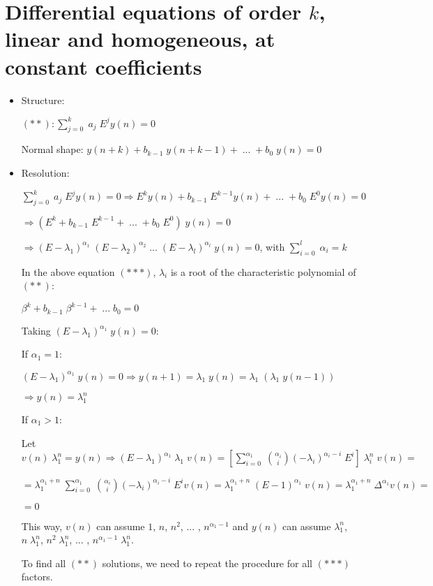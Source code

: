 \documentclass{article}
\begin{document}
\section{Differential equations of order $k$, linear and homogeneous, at constant coefficients}

\begin{itemize}

\item Structure:

$(**): \sum\limits_{j = 0}^{k} \; a_{j} \; E^{j} y(n) = 0$

Normal shape: $y(n + k) + b_{k - 1} \; y(n + k - 1) + \; ... \; + b_{0} \; y(n) = 0$

\item Resolution:

$\sum\limits_{j = 0}^{k} \; a_{j} \; E^{j} y(n) = 0 \Rightarrow E^{k} y(n) + b_{k - 1} \; E^{k - 1} y(n) + \; ... \; + b_{0} \; E^{0} y(n) = 0$

$\Rightarrow (E^{k} + b_{k - 1} \; E^{k - 1} + \; ... \; + b_{0} \; E^{0}) \; y(n) = 0$

$\Rightarrow (E - \lambda_{1})^{\alpha_{1}} \; (E - \lambda_{2})^{\alpha_{2}} \; ... \; (E - \lambda_{l})^{\alpha_{l}} \; y(n) = 0$, with $\sum\limits_{i = 0}^{l} \; \alpha_{i} = k$

In the above equation $(***)$, $\lambda_{i}$ is a root of the characteristic polynomial of $(**)$:

$\beta^{k} + b_{k - 1} \; \beta^{k - 1} + \; ... \; b_{0} = 0$

Taking $(E - \lambda_{1})^{\alpha_{1}} \; y(n) = 0$:

If $\alpha_{1} = 1$:

$(E - \lambda_{1})^{\alpha_{1}} \; y(n) = 0 \Rightarrow y(n + 1) = \lambda_{1} \; y(n) = \lambda_{1} \; (\lambda_{1} \; y(n - 1))$

$\Rightarrow y(n) = \lambda_{1}^{n}$

If $\alpha_{1} > 1$:

Let $v(n) \; \lambda_{1}^{n} = y(n) \Rightarrow (E - \lambda_{1})^{\alpha_{1}} \; \lambda_{1} \; v(n) = [\sum\limits_{i = 0}^{\alpha_{1}} \; \binom{\alpha_{i}}{i} (-\lambda_{i})^{\alpha_{i} - i} \; E^{i}] \; \lambda_{i}^{n} \; v(n) =$

$= \lambda_{1}^{\alpha_{1} + n} \; \sum\limits_{i = 0}^{\alpha_{1}} \; \binom{\alpha_{i}}{i} (-\lambda_{i})^{\alpha_{i} - i} \; E^{i} v(n) = \lambda_{1}^{\alpha_{1} + n} \; (E - 1)^{\alpha_{1}} \; v(n) = \lambda_{1}^{\alpha_{1} + n} \; \Delta^{\alpha_{1}} v(n) =$

$= 0$

This way, $v(n)$ can assume $1$, $n$, $n^{2}$, ... , $n^{\alpha_{1} - 1}$ and $y(n)$ can assume $\lambda_{1}^{n}$, $n \; \lambda_{1}^{n}$, $n^{2} \; \lambda_{1}^{n}$, ... , $n^{\alpha_{1} - 1} \; \lambda_{1}^{n}$.

To find all $(**)$ solutions, we need to repeat the procedure for all $(***)$ factors.


\end{itemize}
\end{document}
